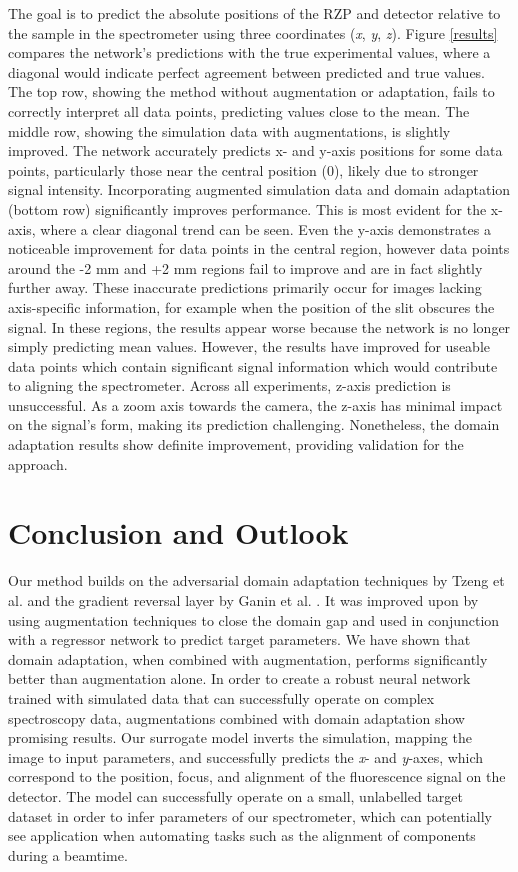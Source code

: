 \documentclass{iopconfser}
\begin{document}
The goal is to predict the absolute positions of the RZP and detector relative to the sample in the spectrometer using three coordinates (\textit{x}, \textit{y}, \textit{z}). Figure \ref{results} compares the network's predictions with the true experimental values, where a diagonal would indicate perfect agreement between predicted and true values. The top row, showing the method without augmentation or adaptation, fails to correctly interpret all data points, predicting values close to the mean. The middle row, showing the simulation data with augmentations, is slightly improved. The network accurately predicts x- and y-axis positions for some data points, particularly those near the central position (0), likely due to stronger signal intensity. Incorporating augmented simulation data and domain adaptation (bottom row) significantly improves performance. This is most evident for the x-axis, where a clear diagonal trend can be seen. Even the y-axis demonstrates a noticeable improvement for data points in the central region, however data points around the -2 mm and +2 mm regions fail to improve and are in fact slightly further away. These inaccurate predictions primarily occur for images lacking axis-specific information, for example when the position of the slit obscures the signal. In these regions, the results appear worse because the network is no longer simply predicting mean values. However, the results have improved for useable data points which contain significant signal information which would contribute to aligning the spectrometer. Across all experiments, z-axis prediction is unsuccessful. As a zoom axis towards the camera, the z-axis has minimal impact on the signal's form, making its prediction challenging. Nonetheless, the domain adaptation results show definite improvement, providing validation for the approach.

\section{Conclusion and Outlook}
Our method builds on the adversarial domain adaptation techniques by Tzeng et al. \cite{8099799} and the gradient reversal layer by Ganin et al. \cite{ganin2016domainadversarialtrainingneuralnetworks}. It was improved upon by using augmentation techniques to close the domain gap and used in conjunction with a regressor network to predict target parameters. We have shown that domain adaptation, when combined with augmentation, performs significantly better than augmentation alone. In order to create a robust neural network trained with simulated data that can successfully operate on complex spectroscopy data, augmentations combined with domain adaptation show promising results. Our surrogate model inverts the simulation, mapping the image to input parameters, and successfully predicts the 
\textit{x}- and \textit{y}-axes, which correspond to the position, focus, and alignment of the fluorescence signal on the detector. The model can successfully operate on a small, unlabelled target dataset in order to infer parameters of our spectrometer, which can potentially see application when automating tasks such as the alignment of components during a beamtime.
\end{document}
